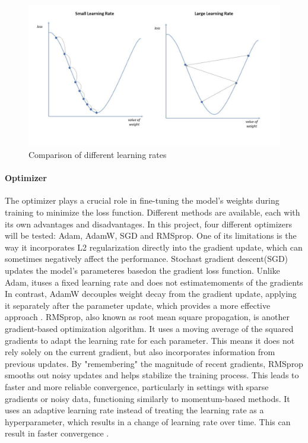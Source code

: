 \documentclass[twocolumn]{article}
\begin{document}
\begin{figure}
    \centering
    \includegraphics[width=1\linewidth]{Learn rate.jpg}
    \caption{Comparison of different learning rates}
    \label{fig:Learnrate}
\end{figure}

\paragraph{Optimizer}
The optimizer plays a crucial role in fine-tuning the model's weights during training to minimize the loss function. 
Different methods are available, each with its own advantages and disadvantages. 
In this project, four different optimizers will be tested: Adam, AdamW, SGD and RMSprop. 
One of its limitations is the way it incorporates L2 regularization directly into the gradient update, which can sometimes negatively affect the performance. 
Stochast gradient descent(SGD) updates the model’s parameteres basedon the gradient loss function. Unlike Adam, ituses a fixed learning rate and does not estimatemoments of the gradients
In contrast, AdamW decouples weight decay from the gradient update, applying it separately after the parameter update, which provides a more effective approach \cite{pykes-2021}.
RMSprop, also known as root mean square propagation, is another gradient-based optimization algorithm. It uses a moving average of the squared gradients to adapt the learning rate for each parameter. 
This means it does not rely solely on the current gradient, but also incorporates information from previous updates. By "remembering" the magnitude of recent gradients, RMSprop smooths out noisy updates and helps stabilize the training process. 
This leads to faster and more reliable convergence, particularly in settings with sparse gradients or noisy data, functioning similarly to momentum-based methods.
It uses an adaptive learning rate instead of treating the learning rate as a hyperparameter, which results in a change of learning rate over time. 
This can result in faster convergence \cite{sanghvirajit-2025}.
\end{document}
